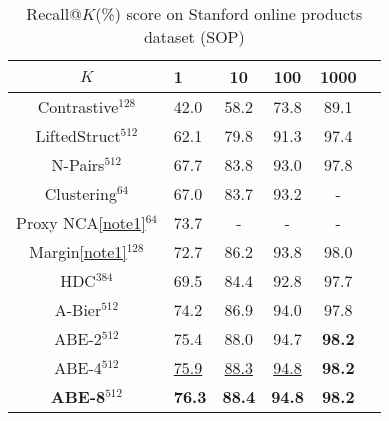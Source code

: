 \documentclass[runningheads]{llncs}
\begin{document}
\setlength{\tabcolsep}{4pt}
\begin{table}
\begin{center}
\caption{Recall@$K$(\%) score on Stanford online products dataset (SOP)}
\vspace{-1mm}
\label{table:sopcomptable}
\scriptsize
\begin{tabular}{Sl cccc}
\hline
$K$ & 1 & 10 & 100 & 1000 \\
\hline
Contrastive$^{128}$ \cite{oh2016deep} & 42.0 & 58.2 & 73.8 & 89.1 \\
LiftedStruct$^{512}$ \cite{oh2016deep} & 62.1 & 79.8 & 91.3 & 97.4 \\
N-Pairs$^{512}$ \cite{sohn2016improved} & 67.7 & 83.8 & 93.0 & 97.8 \\
Clustering$^{64}$ \cite{song2017deep} & 67.0 & 83.7 & 93.2 & - \\
Proxy NCA\ref{note1}$^{64}$ \cite{movshovitz2017no} & 73.7 & - & - & - \\
Margin\ref{note1}$^{128}$ \cite{wu2017sampling} & 72.7 & 86.2 & 93.8 & 98.0 \\
HDC$^{384}$ \cite{yuan2016hard} & 69.5 & 84.4 & 92.8 & 97.7 \\
A-Bier$^{512}$ \cite{opitz2018deep} & 74.2 & 86.9 & 94.0 & 97.8 \\
\hline
ABE-2$^{512}$ & 75.4 & 88.0 & 94.7 & \textbf{98.2} \\
ABE-4$^{512}$ & \underline{75.9} & \underline{88.3} & \underline{94.8} & \textbf{98.2} \\
\textbf{ABE-8$^{512}$} & \textbf{76.3} & \textbf{88.4} & \textbf{94.8} & \textbf{98.2} \\

\hline
\end{tabular}
\end{center}
\end{table}
\setlength{\tabcolsep}{1.4pt}
\end{document}
